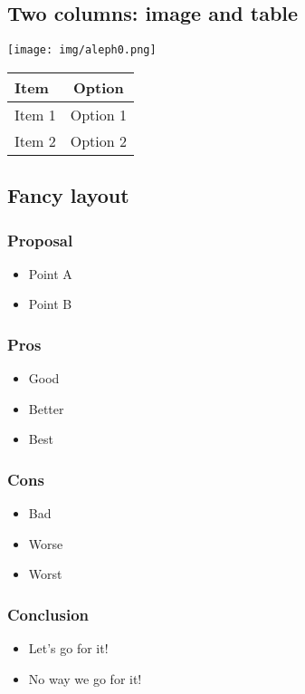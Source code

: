\documentclass[
  11pt,
]{article}
\providecommand{\tightlist}{%
  \setlength{\itemsep}{0pt}\setlength{\parskip}{0pt}}
\begin{document}
\subsection{Two columns: image and
table}\label{two-columns-image-and-table}

\texttt{[image: img/aleph0.png]}

\begin{longtable}[]{@{}lc@{}}
\toprule\noalign{}
\textbf{Item} & \textbf{Option} \\
\midrule\noalign{}
\endhead
\bottomrule\noalign{}
\endlastfoot
Item 1 & Option 1 \\
Item 2 & Option 2 \\
\end{longtable}

\subsection{Fancy layout}\label{fancy-layout}

\subsubsection{Proposal}\label{proposal}

\begin{itemize}
\tightlist
\item
  Point A
\item
  Point B
\end{itemize}

\subsubsection{Pros}\label{pros}

\begin{itemize}
\tightlist
\item
  Good
\item
  Better
\item
  Best
\end{itemize}

\subsubsection{Cons}\label{cons}

\begin{itemize}
\tightlist
\item
  Bad
\item
  Worse
\item
  Worst
\end{itemize}

\subsubsection{Conclusion}\label{conclusion}

\begin{itemize}
\tightlist
\item
  Let's go for it!
\item
  No way we go for it!
\end{itemize}
\end{document}
